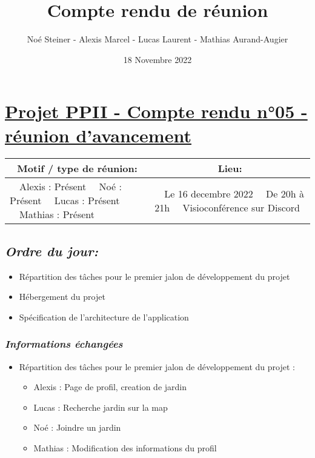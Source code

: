 \documentclass[french,a4paper]{article}
\author{Noé Steiner - Alexis Marcel - Lucas Laurent - Mathias Aurand-Augier}
\date{18 Novembre 2022}
\newcommand{\tabitem}{\textbullet~~}\title{Compte rendu de réunion}
\begin{document}
\maketitle

\section*{\underline{Projet PPII - Compte rendu n°05 - réunion d'avancement}}

\begin{table}[!htb]
  \centering
  \begin{tabular}{| p{7cm} | p{7cm} |}
    \hline
    \multicolumn{1}{|c|}{ Motif / type de réunion:} & \multicolumn{1}{c|}{Lieu:} \\
    \hline
    \tabitem Alexis : Présent\newline
    \tabitem Noé : Présent\newline
    \tabitem Lucas : Présent\newline
    \tabitem Mathias : Présent                      &
    \tabitem Le 16 decembre 2022\newline
    \tabitem De 20h à 21h\newline
    \tabitem Visioconférence sur Discord                                         \\
    \hline
  \end{tabular}
\end{table}

\subsection*{\textit{Ordre du jour:}}

\begin{itemize}
  \item Répartition des tâches pour le premier jalon de développement du projet
  \item Hébergement du projet
  \item Spécification de l'architecture de l'application
\end{itemize}

\subsubsection*{\textit{Informations échangées}}
\begin{itemize}
  \item Répartition des tâches pour le premier jalon de développement du projet :
    \begin{itemize}
      \item Alexis : Page de profil, creation de jardin
      \item Lucas : Recherche jardin sur la map
      \item Noé : Joindre un jardin
      \item Mathias : Modification des informations du profil
    \end{itemize}
\end{itemize}
\end{document}
